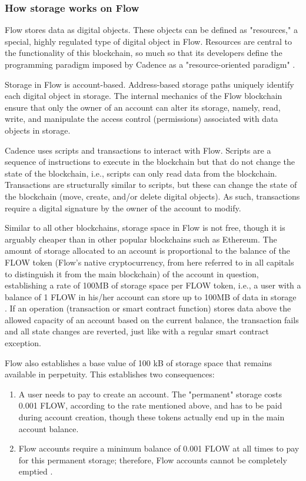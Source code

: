 \subsubsection{How storage works on Flow}
Flow stores data as digital objects. These objects can be defined as "resources," a special, highly regulated type of digital object in Flow. Resources are central to the functionality of this blockchain, so much so that its developers define the programming paradigm imposed by Cadence as a "resource-oriented paradigm" \cite{flow2024}.
\par
Storage in Flow is account-based. Address-based storage paths uniquely identify each digital object in storage. The internal mechanics of the Flow blockchain ensure that only the owner of an account can alter its storage, namely, read, write, and manipulate the access control (permissions) associated with data objects in storage.
\par
Cadence uses scripts and transactions to interact with Flow. Scripts are a sequence of instructions to execute in the blockchain but that do not change the state of the blockchain, i.e., scripts can only read data from the blockchain. Transactions are structurally similar to scripts, but these can change the state of the blockchain (move, create, and/or delete digital objects). As such, transactions require a digital signature by the owner of the account to modify.
\par
Similar to all other blockchains, storage space in Flow is not free, though it is arguably cheaper than in other popular blockchains such as Ethereum. The amount of storage allocated to an account is proportional to the balance of the FLOW token (Flow's native cryptocurrency, from here referred to in all capitals to distinguish it from the main blockchain) of the account in question, establishing a rate of 100MB of storage space per FLOW token, i.e., a user with a balance of 1 FLOW in his/her account can store up to 100MB of data in storage \cite{flow2024}. If an operation (transaction or smart contract function) stores data above the allowed capacity of an account based on the current balance, the transaction fails and all state changes are reverted, just like with a regular smart contract exception.
\par
Flow also establishes a base value of 100 kB of storage space that remains available in perpetuity. This establishes two consequences:

\begin{enumerate}
    \item {A user needs to pay to create an account. The "permanent" storage costs 0.001 FLOW, according to the rate mentioned above, and has to be paid during account creation, though these tokens actually end up in the main account balance.}
    \item {Flow accounts require a minimum balance of 0.001 FLOW at all times to pay for this permanent storage; therefore, Flow accounts cannot be completely emptied \cite{flow2024}.}
\end{enumerate}

